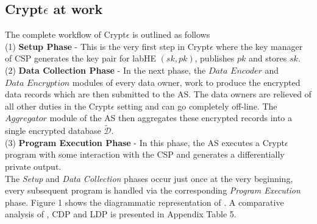 \subsection{Crypt$\epsilon$ at work}
The complete workflow of Crypt$\epsilon$ is outlined as follows\\(1) \textbf{ Setup Phase} - This is the very first step in Crypt$\epsilon$ where the key manager of \textsf{CSP} generates the key pair for labHE $(sk,pk)$, publishes $pk$ and stores $sk$. \\(2) \textbf{ Data Collection Phase }- In the next phase, the $\textit{Data 
Encoder}$ and $\textit{Data Encryption}$ modules of every data owner, work to produce the encrypted data records which are then submitted to the \textsf{AS}. The data owners are relieved of all other duties in the Crypt$\epsilon$ setting and can go completely off-line. The $\textit{Aggregator}$ module of the \textsf{AS} then aggregates these encrypted records into a single encrypted database $\boldsymbol{\tilde{\mathcal{D}}}$. \\(3) \textbf{ Program Execution Phase} - In this phase, the \textsf{AS} executes a Crypt$\epsilon$ program with some interaction with the \textsf{CSP}  and generates a differentially private output.  \\
The \emph{Setup} and \emph{Data Collection} phases occur just once at the very beginning, every subsequent program  is handled via the corresponding  \emph{Program Execution} phase. Figure 1 shows the diagrammatic representation of \system. A comparative analysis of \system, \textsf{CDP} and \textsf{LDP} is presented in Appendix Table 5.

